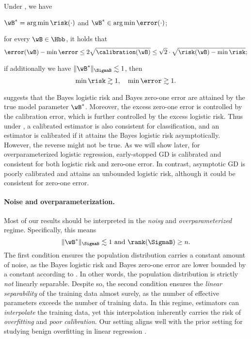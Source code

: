 \documentclass[11pt]{article}
\begin{document}
\begin{proposition}\label{prop:risk-properties}
Under , we have
\begin{assumpenum}
\item $\wB^* = \arg\min\risk(\cdot)$ and $\wB^*\in \arg\min \error(\cdot)$;
\item 
for every $\wB\in\Hbb$, it holds that
\begin{align*}
    \error (\wB) - \min \error  
    \le 2  \sqrt{\calibration(\wB)} 
    \le\sqrt{2}\cdot \sqrt{\risk(\wB) - \min\risk};
\end{align*}
\item if additionally we have $\|\wB^*\|_{\SigmaB} \lesssim 1$, then 
\begin{align*}
    \min \risk  \gtrsim 1,\quad \min \error \gtrsim 1.
\end{align*}
\end{assumpenum}
\end{proposition}

 suggests that the Bayes logistic risk and Bayes zero-one error are attained by the true model parameter $\wB^*$. Moreover, the excess zero-one error is controlled by the calibration error, which is further controlled by the excess logistic risk. 
Thus under , a calibrated estimator is also consistent for classification, and an estimator is calibrated if it attains the Bayes logistic risk asymptotically.
However, the reverse might not be true.
As we will show later, for overparameterized logistic regression, early-stopped GD is calibrated and consistent for both logistic risk and zero-one error. In contrast, asymptotic GD is poorly calibrated and attains an unbounded logistic risk, although it could be consistent for zero-one error. 


\paragraph{Noise and overparameterization.}
Most of our results should be interpreted in the \emph{noisy} and \emph{overparameterized} regime. Specifically, this means \[\|\wB^*\|_{\SigmaB} \lesssim 1\  \text{and}\ \rank(\SigmaB) \ge n.\] The first condition ensures the population distribution carries a constant amount of noise, as the Bayes logistic risk and Bayes zero-one error are lower bounded by a constant according to . In other words, the population distribution is strictly \emph{not} linearly separable. 
Despite so, the second condition ensures the \emph{linear separability} of the training data almost surely, as the number of effective parameters exceeds the number of training data. 
In this regime, estimators can \emph{interpolate} the training data, yet this interpolation inherently carries the risk of \emph{overfitting} and \emph{poor calibration}. 
Our setting aligns well with the prior setting for studying benign overfitting in linear regression \citep{bartlett2020benign,tsigler2023benign}.
\end{document}
